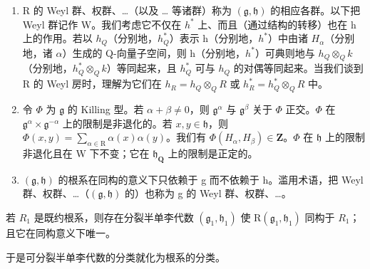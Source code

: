 \begin{enumerate}
\def\labelenumi{\arabic{enumi})}
\setcounter{enumi}{9}
\item
  R 的 Weyl 群、权群、\ldots{}（以及 \ldots{} 等诸群）称为 \((\mathfrak{g},\mathfrak{h})\) 的相应各群。以下把 Weyl 群记作 W。我们考虑它不仅在 \(h^{*}\) 上、而且（通过结构的转移）也在 h 上的作用。若以 \(h_{Q}\)（分别地，\(h_{Q}^{*}\)）表示 h（分别地，\(h^{*}\)）中由诸 \(H_{\alpha}\)（分别地，诸 \(\alpha\)）生成的 Q-向量子空间，则 h（分别地，\(h^{*}\)）可典则地与 \(h_{Q} \otimes_{Q} k\)（分别地，\(h_{Q}^{*} \otimes_{Q} k\)）等同起来，且 \(h_{Q}^{*}\) 可与 \(h_{Q}\) 的对偶等同起来。当我们谈到 R 的 Weyl 房时，理解为它们在 \(h_{R} = h_{Q} \otimes_{Q} R\) 或 \(h_{R}^{*} = h_{Q}^{*} \otimes_{Q} R\) 中。
\item
  令 \(\varPhi\) 为 \(\mathfrak{g}\) 的 Killing 型。若 \(\alpha + \beta \neq 0\)，则 \(\mathfrak{g}^{\alpha}\) 与 \(\mathfrak{g}^{\beta}\) 关于 \(\varPhi\) 正交。\(\varPhi\) 在 \(\mathfrak{g}^{\alpha} \times \mathfrak{g}^{-\alpha}\) 上的限制是非退化的。若 \(x, y \in \mathfrak{h}\)，则 \(\varPhi(x, y) = \sum_{\alpha \in \mathrm{R}} \alpha(x)\alpha(y)\)。我们有 \(\varPhi(H_{\alpha}, H_{\beta}) \in \mathbf{Z}\)。\(\varPhi\) 在 \(\mathfrak{h}\) 上的限制非退化且在 W 下不变；它在 \(\mathfrak{h}_{\mathbf{Q}}\) 上的限制是正定的。
\item
  \((\mathfrak{g},\mathfrak{h})\) 的根系在同构的意义下只依赖于 g 而不依赖于 h。滥用术语，把 Weyl 群、权群、\ldots{}（\((\mathfrak{g},\mathfrak{h})\) 的）也称为 g 的 Weyl 群、权群、\ldots{}。
\end{enumerate}

若 \(R_{1}\) 是既约根系，则存在分裂半单李代数 \((\mathfrak{g}_{1},\mathfrak{h}_{1})\) 使 \(\mathrm{R}(\mathfrak{g}_{1},\mathfrak{h}_{1})\) 同构于 \(R_{1}\)；且它在同构意义下唯一。

于是可分裂半单李代数的分类就化为根系的分类。

